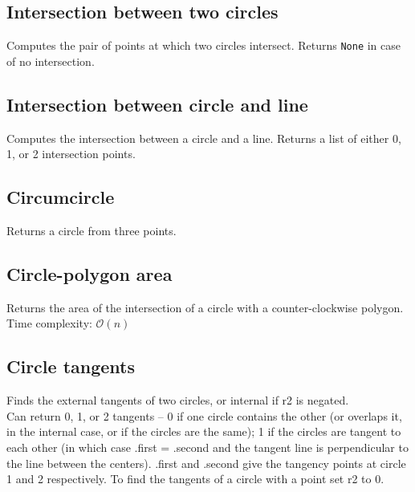 \documentclass{article}
\begin{document}
\subsection*{Intersection between two circles}
Computes the pair of points at which two circles intersect. Returns \lstinline{None} in case of no intersection.
\begin{multicols}{2}
  
  \columnbreak
  
\end{multicols}

\subsection*{Intersection between circle and line}
Computes the intersection between a circle and a line. Returns a list of either 0, 1, or 2 intersection points.
\begin{multicols}{2}
  
  \columnbreak
  
\end{multicols}

\subsection*{Circumcircle}
Returns a circle from three points.
\begin{multicols}{2}
  
  \columnbreak
  
\end{multicols}

\subsection*{Circle-polygon area}
Returns the area of the intersection of a circle with a counter-clockwise polygon.
Time complexity: $\mathcal{O}(n)$


\subsection*{Circle tangents}
Finds the external tangents of two circles, or internal if r2 is negated.\\
Can return 0, 1, or 2 tangents -- 0 if one circle contains the other (or overlaps it, in the internal case, or if the circles are the same);
1 if the circles are tangent to each other (in which case .first = .second and the tangent line is perpendicular to the line between the centers).
.first and .second give the tangency points at circle 1 and 2 respectively.
To find the tangents of a circle with a point set r2 to 0.
\begin{multicols}{2}
  
  \columnbreak
  
\end{multicols}
\end{document}
